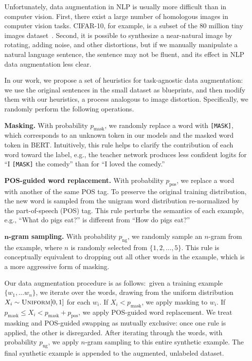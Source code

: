 \documentclass[11pt,a4paper]{article}
\newcommand{\parheader}[1]{{\smallskip \noindent \bf #1.}}
\begin{document}
Unfortunately, data augmentation in NLP is usually more difficult than in computer vision. First, there exist a large number of homologous images in computer vision tasks. CIFAR-10, for example, is a subset of the 80 million tiny images dataset~\cite{krizhevsky2009learning}. 
Second, it is possible to synthesize a near-natural image by rotating, adding noise, and other distortions, but if we manually manipulate a natural language sentence, the sentence may not be fluent, and its effect in NLP data augmentation less clear.



In our work, we propose a set of heuristics for task-agnostic data augmentation: we use the original sentences in the small dataset as blueprints, and then modify them with our heuristics, a process analogous to image distortion. Specifically, we randomly perform the following operations.

\parheader{Masking}
With probability $p_{\text{mask}}$, we randomly replace a word with \texttt{[MASK]}, which corresponds to an unknown token in our models and the masked word token in BERT. Intuitively, this rule helps to clarify the contribution of each word toward the label, e.g., the teacher network produces less confident logits for ``I \texttt{[MASK]} the comedy'' than for ``I loved the comedy.''

\parheader{POS-guided word replacement}
With probability $p_{\text{pos}}$, we replace a word with another of the same POS tag. 
To preserve the original training distribution, the new word is sampled from the unigram word distribution re-normalized by the part-of-speech (POS) tag.
This rule perturbs the semantics of each example, e.g., ``What do pigs eat?'' is different from ``How do pigs eat?''

\parheader{$\pmb n$-gram sampling}
With probability $p_{\text{ng}}$, we randomly sample an $n$-gram from the example, where $n$ is randomly selected from {$\{1, 2, \dots, 5\}$}.
This rule is conceptually equivalent to dropping out all other words in the example, which is a more aggressive form of masking.

\smallskip 

Our data augmentation procedure is as follows:~given a training example $\{w_1, \dots w_n\}$, we iterate over the words, drawing from the uniform distribution $X_i \sim \textsc{Uniform}[0, 1]$ for each $w_i$.
If $X_i < p_\text{mask}$, we apply masking to $w_i$. 
If $p_\text{mask} \leq X_i < p_\text{mask} + p_\text{pos}$, we apply POS-guided word replacement. We treat masking and POS-guided swapping as mutually exclusive: once one rule is applied, the other is disregarded.
After iterating through the words, with probability $p_\text{ng}$, we apply $n$-gram sampling to this entire synthetic example.
The final synthetic example is appended to the augmented, unlabeled dataset.
\end{document}
